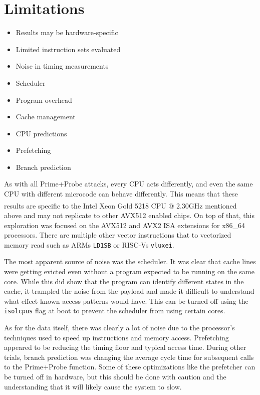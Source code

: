 \documentclass[article]{IEEEtran}
\begin{document}
\section{Limitations}
\begin{itemize}
    \item Results may be hardware-specific
    \item Limited instruction sets evaluated
    \item Noise in timing measurements
        \item Scheduler
        \item Program overhead
        \item Cache management
    \item CPU predictions
        \item Prefetching
        \item Branch prediction
\end{itemize}
As with all Prime+Probe attacks, every CPU acts differently, and even the same CPU with different microcode can behave differently. This means that these results are specific to the Intel\textsuperscript{\tiny\textregistered} Xeon\textsuperscript{\tiny\textregistered} Gold 5218 CPU @ 2.30GHz mentioned above and may not replicate to other AVX512 enabled chips. On top of that, this exploration was focused on the AVX512 and AVX2 ISA extensions for x86\_64 processors. There are multiple other vector instructions that to vectorized memory read such as ARMs \texttt{LD1SB} or RISC-Vs \texttt{vluxei}.

The most apparent source of noise was the scheduler. It was clear that cache lines were getting evicted even without a program expected to be running on the same core. While this did show that the program can identify different states in the cache, it trampled the noise from the payload and made it difficult to understand what effect known access patterns would have. This can be turned off using the \texttt{isolcpus} flag at boot to prevent the scheduler from using certain cores.

As for the data itself, there was clearly a lot of noise due to the processor's techniques used to speed up instructions and memory access. Prefetching appeared to be reducing the timing floor and typical access time. During other trials, branch prediction was changing the average cycle time for subsequent calls to the Prime+Probe function. Some of these optimizations like the prefetcher can be turned off in hardware, but this should be done with caution and the understanding that it will likely cause the system to slow.
\end{document}
